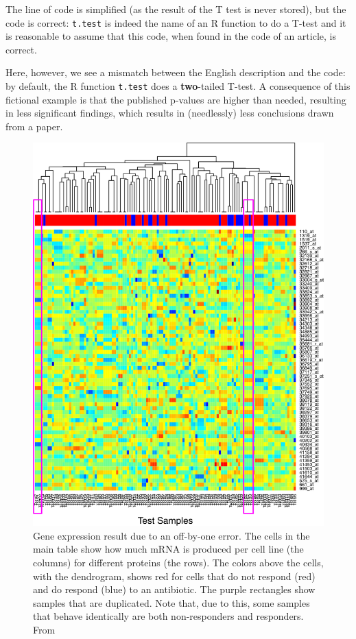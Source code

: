 The line of code is simplified (as the result of the T test is never stored),
but the code is correct:
\verb|t.test| is indeed the name of an R function to do a T-test
and it is reasonable to assume that this code, when found in the code
of an article, is correct.

Here, however, we see a mismatch between the English description and the code:
by default, the R function \verb|t.test| does a \textbf{two}-tailed T-test.
A consequence of this fictional example is that the published p-values are
higher than needed, resulting in less significant findings, which
results in (needlessly) less conclusions drawn from a paper.

\begin{figure}[!htbp]
  \centering
  \includegraphics[width=\linewidth]{baggerly2009deriving_fig_1a.png}
  \caption{
    Gene expression result due to an off-by-one error.
    The cells in the main table show how much mRNA is produced per cell 
    line (the columns) for different proteins (the rows).
    The colors above the cells, with the dendrogram, shows
    red for cells that do not respond (red) and do respond (blue) to an 
    antibiotic.
    The purple rectangles show samples that are duplicated.
    Note that, due to this, some
    samples that behave identically are both non-responders and responders.
    From \cite{baggerly2009deriving}
  }
  \label{fig:baggerly2009deriving}
\end{figure}

